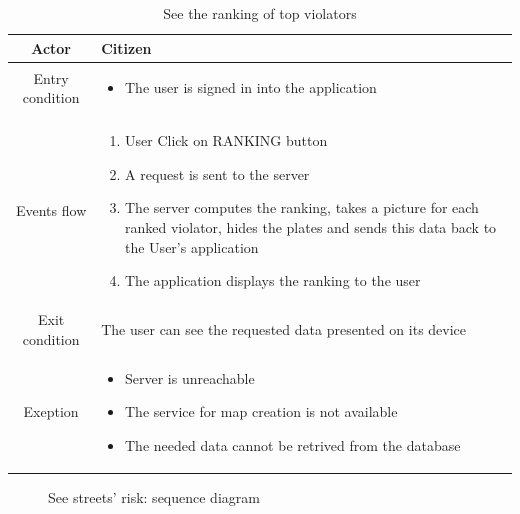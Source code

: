 \documentclass{article}
\begin{document}
		\begin{table} [H]
		\begin{center}
		\caption{See the ranking of top violators}
		\begin{tabular}{|c|p{8cm}|}
			\hline
			Actor			&	Citizen\\
			\hline
			Entry condition	&	\begin{itemize}[noitemsep,topsep=0pt]
								\item The user is signed in into the application
								\end{itemize}\\
			\hline
			 Events flow		&	\begin{enumerate}[noitemsep,topsep=0pt]
									\item User Click on RANKING button			
									\item A request is sent to the server
									\item The server computes the ranking, takes a picture for
									each ranked violator, hides the plates and sends this data 
									back to the User's application
									\item The application displays the ranking to the user
								\end{enumerate}\\
			\hline
			Exit condition 	&	The user can see the requested data presented on its device\\
			\hline
			Exeption			&	\begin{itemize}[noitemsep,topsep=0pt]
									\item Server is unreachable
									\item The service for map creation is not available
									\item The needed data cannot be retrived from the database
								\end{itemize}\\
			\hline
		\end{tabular}
		\end{center}
		\end{table} 
		
		\begin{figure}[H]
			\def\svgwidth{\columnwidth}
			
			\caption{See streets' risk: sequence diagram}
		\end{figure}		
		
\end{document}
